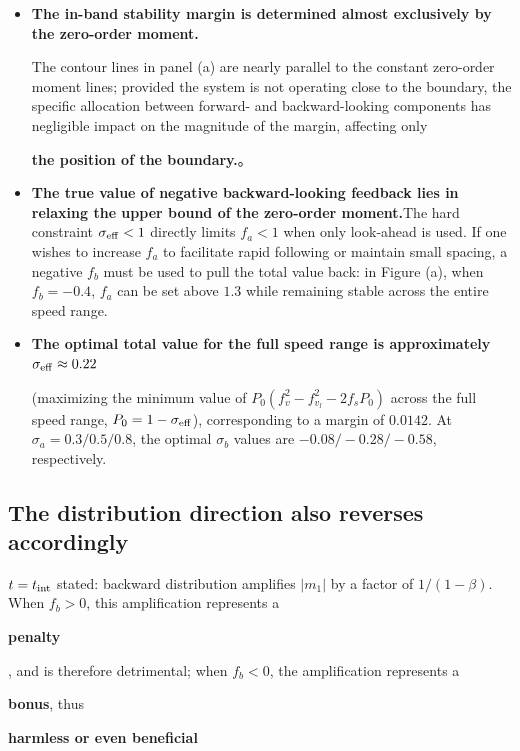 \documentclass[11pt,a4paper,openany]{book}
\numberwithin{equation}{chapter}
\numberwithin{figure}{chapter}
\numberwithin{table}{chapter}
\begin{document}
\begin{itemize}[leftmargin=1.4em,itemsep=4pt]
\item \textbf{The in-band stability margin is determined almost exclusively by the zero-order moment.}

The contour lines in panel (a) are nearly parallel to the constant zero-order moment lines; provided the system is not operating close to the boundary, the specific allocation between forward- and backward-looking components has negligible impact on the magnitude of the margin, affecting only

\textbf{the position of the boundary.}。

\item \textbf{The true value of negative backward-looking feedback lies in relaxing the upper bound of the zero-order moment.}The hard constraint $\sigma_{\rm eff}<1$ directly limits $f_a<1$ when only look-ahead is used. If one wishes to increase $f_a$ to facilitate rapid following or maintain small spacing, a negative $f_b$ must be used to pull the total value back: in Figure (a), when $f_b=-0.4$, $f_a$ can be set above $1.3$ while remaining stable across the entire speed range.



\item \textbf{The optimal total value for the full speed range is approximately $\sigma_{\rm eff}\approx0.22$
}

(maximizing the minimum value of $P_0\left(f_v^2-f_{v_l}^2-2f_sP_0\right)$ across the full speed range, $P_0=1-\sigma_{\rm eff}$), corresponding to a margin of $0.0142$. At $\sigma_a=0.3/0.5/0.8$, the optimal $\sigma_b$ values are $-0.08/-0.28/-0.58$, respectively.


\end{itemize}

\subsection{The distribution direction also reverses accordingly}

$t=t_{\rm int}$ stated: backward distribution amplifies $|m_1|$ by a factor of $1/(1-\beta)$. When $f_b>0$, this amplification represents a

\textbf{penalty}

, and is therefore detrimental; when $f_b<0$, the amplification represents a

\textbf{bonus}, thus

\textbf{harmless or even beneficial}
\end{document}
